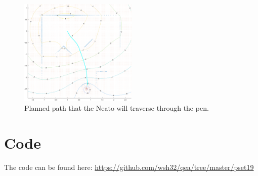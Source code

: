 \begin{figure}[htb!]
    \centering
    \includegraphics[width=0.5\textwidth]{img/neato_path.png}
    \caption{Planned path that the Neato will traverse through the pen.}
    \label{fig:plannedpath}
\end{figure}

\section{Code}

The code can be found here: \url{https://github.com/wsh32/qea/tree/master/pset19}


